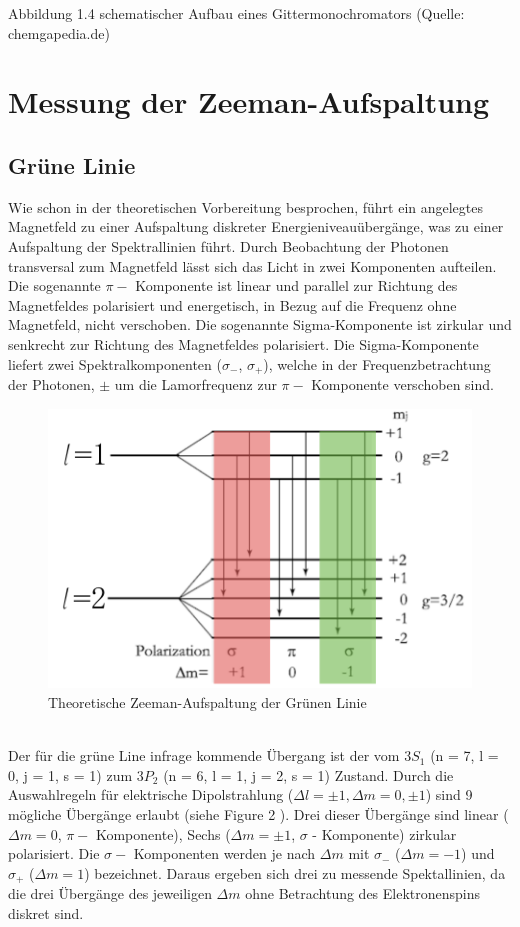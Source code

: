 \documentclass[10pt,a4paper]{article}
\begin{document}
Abbildung 1.4 schematischer Aufbau eines Gittermonochromators (Quelle: chemgapedia.de)

\section{Messung der Zeeman-Aufspaltung}


\subsection{Grüne Linie}

Wie schon in der theoretischen Vorbereitung besprochen, führt ein angelegtes Magnetfeld zu einer Aufspaltung diskreter Energieniveauübergänge, was zu einer Aufspaltung der Spektrallinien führt. Durch Beobachtung der Photonen transversal zum Magnetfeld lässt sich das Licht in zwei Komponenten aufteilen. Die sogenannte $\pi - $ Komponente ist linear und parallel zur Richtung des Magnetfeldes polarisiert und energetisch, in Bezug auf die Frequenz ohne Magnetfeld, nicht verschoben. Die sogenannte Sigma-Komponente ist zirkular und senkrecht zur Richtung des Magnetfeldes polarisiert. Die Sigma-Komponente liefert zwei Spektralkomponenten ($\sigma _{-}$, $\sigma _{+}$), welche in der Frequenzbetrachtung der Photonen, $\pm $ um   die Lamorfrequenz zur $\pi - $ Komponente verschoben sind.  
\\
\begin{figure}[h]
	\includegraphics[scale = 1]{Zeeman_splitting.png}
	\centering
	\caption{Theoretische Zeeman-Aufspaltung der Grünen Linie}
	\label{aufbau2}
\end{figure}
\\
Der für die grüne Line infrage kommende Übergang ist der vom $3S_{1}$ (n = 7, l = 0, j = 1, s = 1) zum $3P_{2}$ (n = 6, l = 1, j = 2, s = 1) Zustand. Durch die Auswahlregeln für elektrische Dipolstrahlung ($\Delta l = \pm 1 , \Delta m =  0,\pm1$) sind 9 mögliche Übergänge erlaubt (siehe Figure 2 ). Drei dieser Übergänge sind linear ($\Delta m = 0$, $\pi - $ Komponente), Sechs ($\Delta m = \pm 1$, $\sigma   $ - Komponente) zirkular polarisiert. Die $\sigma -  $ Komponenten  werden je nach $ \Delta m $ mit $\sigma _{-}  $ ($\Delta m = -1$) und $\sigma _{+}  $ ($\Delta m = 1$) bezeichnet.   Daraus ergeben sich drei zu messende Spektallinien, da die drei Übergänge des jeweiligen $\Delta m$ ohne Betrachtung des Elektronenspins diskret sind.
\end{document}
